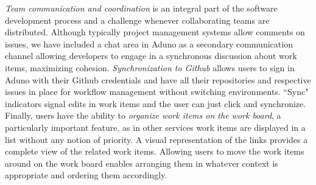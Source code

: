 \documentclass[conference]{IEEEtran}
\begin{document}
%
\textit{Team communication and coordination} is an integral part of the software development process and a challenge whenever collaborating teams are distributed. Although typically project management systems allow comments on issues, we have included a chat area in Aduno as a secondary communication channel allowing developers to engage in a synchronous discussion about work items, maximizing cohesion. \textit{Synchronization to Github} allows users to sign in Aduno with their Github credentials and have all their repositories and respective issues in place for workflow management without switching environments. ``Sync" indicators signal edits in work items and the user can just click and synchronize. Finally, users have the ability to \textit{organize work items on the work board}, a particularly important feature, as in other services work items are displayed in a list without any notion of priority. A visual representation of the links provides a complete view of the related work items. Allowing users to move the work items around on the work board enables arranging them in whatever context is appropriate and ordering them accordingly. %
%
%
%
%
\end{document}
